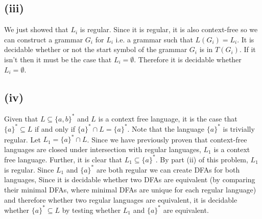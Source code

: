 \documentclass[12pt]{article}
\begin{document}
\subsection*{(iii)}
We just showed that $L_i$ is regular. Since it is regular, it is also
context-free so we can construct a grammar $G_i$ for $L_i$ i.e. a grammar such
that $L(G_i) = L_i$. It is decidable whether or not the start symbol of the
grammar $G_i$ is in $T(G_i)$. If it isn't then it must be the case that
$L_i = \emptyset$. Therefore it is decidable whether $L_i = \emptyset$.

\subsection*{(iv)} Given that $L \subseteq \{a,b\}^*$ and $L$ is a context free
language, it is the case that $\{a\}^* \subseteq L$ if and only if
$\{a\}^* \cap L=\{a\}^*$. Note that the language $\{a\}^*$ is trivially regular.
Let $L_1=\{a\}^* \cap L$. Since we have previously proven that context-free
languages are closed under intersection with regular languages, $L_1$ is a
context free language. Further, it is clear that $L_1 \subseteq \{a\}^*$.
By part (ii) of this problem, $L_1$ is regular. Since $L_1$ and $\{a\}^*$ are
both regular we can create DFAs for both languages, Since it is decidable
whether two DFAs are equivalent (by comparing their minimal DFAs, where minimal
DFAs are unique for each regular language) and therefore whether two regular
languages are equivalent, it is decidable whether $\{a\}^* \subseteq L$
by testing whether $L_1$ and $\{a\}^*$ are equivalent.
\end{document}
